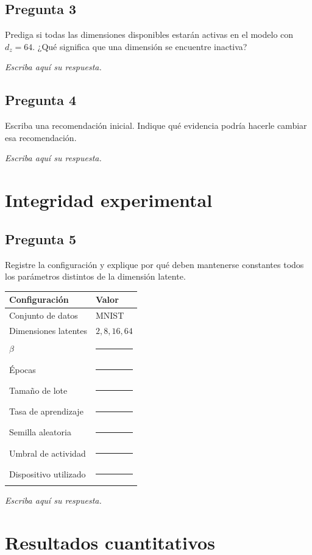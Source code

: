 \documentclass[11pt,letterpaper]{article}
\newcommand{\answerarea}[1][2.1cm]{%
\begin{responsebox}
\textit{Escriba aquí su respuesta.}
\vspace{#1}
\end{responsebox}
}
\begin{document}
\subsection*{Pregunta 3}
Prediga si todas las dimensiones disponibles estarán activas en el modelo con
$d_z=64$. ¿Qué significa que una dimensión se encuentre inactiva?
\answerarea[2.3cm]

\subsection*{Pregunta 4}
Escriba una recomendación inicial. Indique qué evidencia podría hacerle cambiar
esa recomendación.
\answerarea[2.5cm]

\section{Integridad experimental}

\subsection*{Pregunta 5}
Registre la configuración y explique por qué deben mantenerse constantes todos
los parámetros distintos de la dimensión latente.

\begin{center}
\renewcommand{\arraystretch}{1.3}
\begin{tabular}{@{}ll@{}}
\toprule
Configuración & Valor \\
\midrule
Conjunto de datos & MNIST \\
Dimensiones latentes & $2,8,16,64$ \\
$\beta$ & \rule{3cm}{0.4pt} \\
Épocas & \rule{3cm}{0.4pt} \\
Tamaño de lote & \rule{3cm}{0.4pt} \\
Tasa de aprendizaje & \rule{3cm}{0.4pt} \\
Semilla aleatoria & \rule{3cm}{0.4pt} \\
Umbral de actividad & \rule{3cm}{0.4pt} \\
Dispositivo utilizado & \rule{3cm}{0.4pt} \\
\bottomrule
\end{tabular}
\end{center}
\answerarea[2.3cm]

\section{Resultados cuantitativos}
\end{document}
